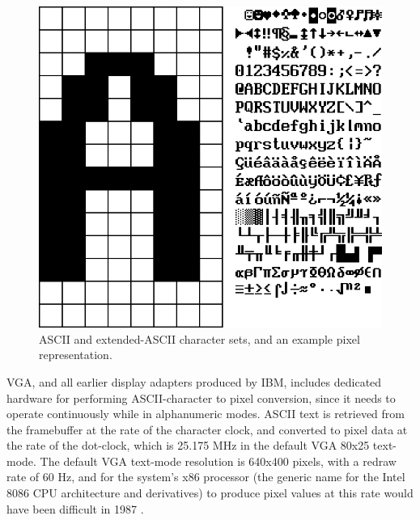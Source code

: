 \begin{figure}[h!]
\begin{center}
\includegraphics[width=\linewidth]{images/ascii.png}
\caption[ASCII and extended-ASCII character set]{ASCII and extended-ASCII
character sets, and an example pixel representation.}
\label{INTRO_ASCII}
\end{center}
\end{figure}

VGA, and all earlier display adapters produced by IBM, includes dedicated
hardware for performing ASCII-character to pixel conversion, since it needs to
operate continuously while in alphanumeric modes. ASCII text is retrieved from
the framebuffer at the rate of the character clock, and converted to pixel data
at the rate of the dot-clock, which is 25.175 MHz in the default VGA 80x25
text-mode. The default VGA text-mode resolution is 640x400 pixels, with a redraw
rate of 60 Hz, and for the system's \gls{x86} processor (the generic name for the Intel
8086 CPU architecture and derivatives) to produce pixel values at this rate would have been difficult
in 1987 .

